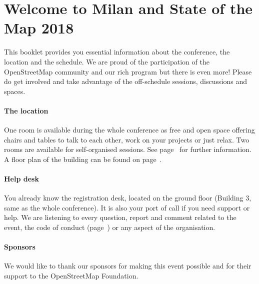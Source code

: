 \newpage
\section*{Welcome to Milan and State of the Map 2018} \label{welcome}
This booklet provides you essential information
about the conference, the location and the schedule.  We are proud of the participation of the
OpenStreetMap community and our rich program but there is even more!  Please do get involved and
take advantage of the off-schedule sessions, discussions and spaces.

\paragraph*{The location} \label{welcome-location}
One room is available during the whole conference as free and open space offering chairs and tables
to talk to each other, work on your projects or just relax.  Two rooms are available for
self-organised sessions.  See page~\pageref{self-organised} for further information.  A floor plan
of the building can be found on page~\pageref{floorplan}.

\paragraph*{Help desk} \label{welcome-helpdesk}
You already know the registration desk, located on the ground floor (Building 3, same as the whole
conference).  It is also your port of call if you need support or help. We are listening to every
question, report and comment related to the event, the code of conduct (page~\pageref{coc}) or any
aspect of the organisation.

\paragraph*{Sponsors} \label{welcome-sponsors}
We would like to thank our sponsors for making this event possible and for their support to the
OpenStreetMap Foundation.
\newpage
